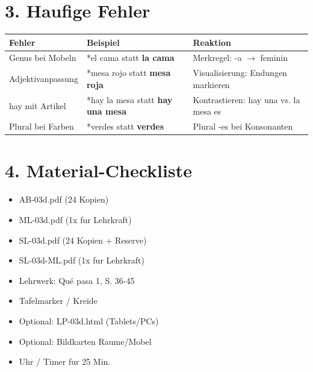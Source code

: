 \documentclass[11pt, a4paper]{article}
\newcommand{\fachfarbe}{spanisch}
\newcommand{\lerngruppengroesse}{24}
\newcommand{\es}[1]{\textcolor{\fachfarbe}{\textbf{#1}}}
\begin{document}
\section*{3. Haufige Fehler}

\begin{fehlerbox}
\begin{tabularx}{\textwidth}{|l|X|X|}
\hline
\textbf{Fehler} & \textbf{Beispiel} & \textbf{Reaktion} \\
\hline
Genus bei Mobeln & *el cama statt \es{la cama} & Merkregel: -a $\rightarrow$ feminin \\
\hline
Adjektivanpassung & *mesa rojo statt \es{mesa roja} & Visualisierung: Endungen markieren \\
\hline
hay mit Artikel & *hay la mesa statt \es{hay una mesa} & Kontrastieren: hay una vs. la mesa es \\
\hline
Plural bei Farben & *verdes statt \es{verdes} & Plural -es bei Konsonanten \\
\hline
\end{tabularx}
\end{fehlerbox}


\section*{4. Material-Checkliste}

\begin{materialbox}
\begin{itemize}[label=$\square$]
    \item AB-03d.pdf (\lerngruppengroesse{} Kopien)
    \item ML-03d.pdf (1x fur Lehrkraft)
    \item SL-03d.pdf (\lerngruppengroesse{} Kopien + Reserve)
    \item SL-03d-ML.pdf (1x fur Lehrkraft)
    \item Lehrwerk: Qué pasa 1, S. 36-45
    \item Tafelmarker / Kreide
    \item Optional: LP-03d.html (Tablets/PCs)
    \item Optional: Bildkarten Raume/Mobel
    \item Uhr / Timer fur 25 Min.
\end{itemize}
\end{materialbox}
\end{document}
